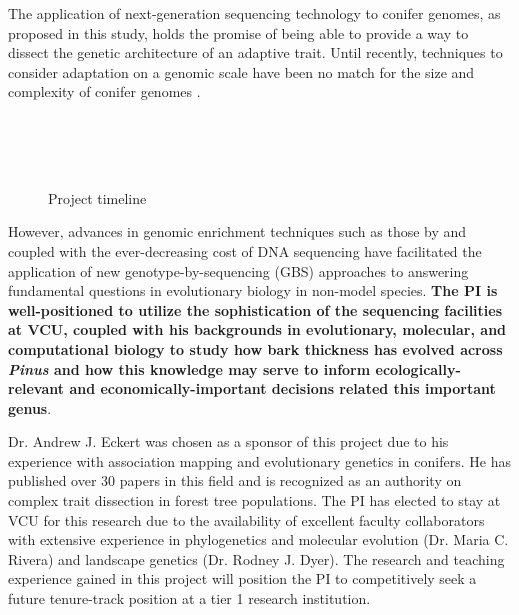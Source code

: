 The application of next-generation sequencing technology to conifer genomes, as proposed in this study, holds the promise of 
being able to provide a way to dissect the genetic architecture of an adaptive trait.  Until recently, techniques 
to consider adaptation on a genomic scale have been no match for the size and complexity of conifer genomes \citep{Mackay:2012hr}.  
\begin{figure}
\setlength{\abovecaptionskip}{5pt}
	\begin{ganttchart}[vgrid]{12}
	\\
	
	\\
	
	\\

	\end{ganttchart}
\caption{Project timeline}
\vspace{-10pt}
\label{f:timeline}
\end{figure}
However, advances in genomic enrichment techniques such as those by \citet{Parchman:2012ca} and \citet{Willing:2011jb} 
coupled with the ever-decreasing cost of DNA sequencing have facilitated the application of new genotype-by-sequencing (GBS) 
approaches to answering fundamental questions in evolutionary biology in non-model species.  \textbf{The PI is well-positioned 
to utilize the sophistication of the sequencing facilities at VCU, coupled with his backgrounds in evolutionary, molecular, and 
computational biology to study how bark thickness has evolved across \emph{Pinus} and how this knowledge may serve to 
inform ecologically-relevant and economically-important decisions related this important genus}.

Dr. Andrew J. Eckert was chosen as a sponsor of this project due to his experience with association mapping 
and evolutionary genetics in conifers. He has published over 30 papers in this field and is recognized as an authority 
on complex trait dissection in forest tree populations.  The PI has elected to stay at VCU for this research due to the availability 
of excellent faculty collaborators with extensive experience in phylogenetics and molecular evolution (Dr. Maria C. Rivera) and 
landscape genetics (Dr. Rodney J. Dyer).  The research and teaching experience gained in this project will position the PI to 
competitively seek a future tenure-track position at a tier 1 research institution.      

